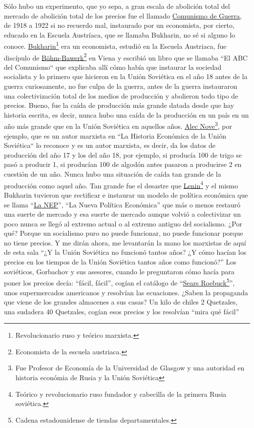 Sólo hubo un experimento, que yo sepa, a gran escala de abolición total del mercado de abolición total de los precios fue el llamado \href{https://en.wikipedia.org/wiki/War_communism}{Comunismo de Guerra}, de 1918 a 1922 si no recuerdo mal, instaurado por un economista, por cierto, educado en la Escuela Austríaca, que se llamaba Bukharin, no sé si alguno lo conoce. \href{https://en.wikipedia.org/wiki/Nikolai_Bukharin}{Bukharin}\footnote{Revolucionario ruso y teórico marxista.} era un economista, estudió en la Escuela Austriaca, fue discípulo de \href{https://en.wikipedia.org/wiki/Eugen_von_B%C3%B6hm-Bawerk}{Böhm-Bawerk}\footnote{Economista de la escuela austriaca.} en Viena y escribió un libro que se llamaba ``El ABC del Comunismo``\citep{bukharin1920abc} que explicaba allí cómo había que instaurar la sociedad socialista y lo primero que hicieron en la Unión Soviética en el año 18 antes de la guerra curiosamente, no fue culpa de la guerra, antes de la guerra instauraron una colectivización total de los medios de producción y abolieron todo tipo de precios. Bueno, fue la caída de producción más grande datada desde que hay historia escrita, es decir, nunca hubo una caída de la producción en un país en un año más grande que en la Unión Soviética en aquellos años. \href{https://en.wikipedia.org/wiki/Alexander_Nove}{Alec Nove}\footnote{Fue Profesor de Economía de la Universidad de Glasgow y una autoridad en historia económia de Rusia y la Unión Soviética}, por ejemplo, que es un autor marxista en ``La Historia Económica de la Unión Soviética``\citep{nove1992economic} lo reconoce y es un autor marxista, es decir, da los datos de producción del año 17 y los del año 18, por ejemplo, si producía 100 de trigo se pasó a producir 1, si producían 100 de algodón antes pasaron a producirse 2 en cuestión de un año. Nunca hubo una situación de caída tan grande de la producción como aquel año. Tan grande fue el desastre que \href{https://en.wikipedia.org/wiki/Vladimir_Lenin}{Lenin}\footnote{Teórico y revolucionario ruso fundador y cabecilla de la primera Rusia soviética.} y el mismo Bukharin tuvieron que rectificar e instaurar un modelo de política económica que se llama \enquote{\href{https://en.wikipedia.org/wiki/New_Economic_Policy}{La NEP}}, \enquote{La Nueva Política Económica} que más o menos restauró una suerte de mercado y esa suerte de mercado aunque volvió a colectivizar un poco nunca se llegó al extremo actual o al extremo antiguo del socialismo. ¿Por qué? Porque un socialismo puro no puede funcionar, no puede funcionar porque no tiene precios. Y me dirán ahora, me levantarán la mano los marxistas de aquí de esta sala \enquote{¿Y la Unión Soviética no funcionó tantos años? ¿Y cómo hacían los precios en los tiempos de la Unión Soviética tantos años como funcionó?} Los soviéticos, Gorbachov y sus asesores, cuando le preguntaron cómo hacía para poner los precios decía: \enquote{fácil, fácil}, cogían el catálogo de \enquote{\href{https://en.wikipedia.org/wiki/Sears}{Sears Roebuck}\footnote{Cadena estadounidense de tiendas departamentales.}}, unos supermercados americanos y resolvían las ecuaciones. ¿Saben la propaganda que viene de los grandes almacenes a sus casas? Un kilo de chiles 2 Quetzales, una sudadera 40 Quetzales, cogían esos precios y los resolvían \enquote{mira qué fácil} 